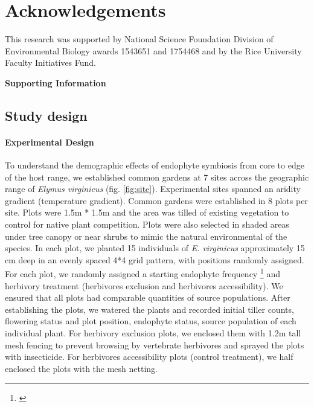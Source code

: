 \documentclass[12pt]{article}\usepackage[]{graphicx}\usepackage[dvipsnames]{xcolor}
\newcommand{\jacob}[2]{{\color{blue}{#1}}\footnote{\textit{\color{blue}{#2}}}}
\begin{document}
\section*{Acknowledgements}
This research was supported by National Science Foundation Division of Environmental Biology awards 1543651 and 1754468 and by the Rice University Faculty Initiatives Fund.



\newpage


\newpage
\clearpage 
\setcounter{equation}{0}
\setcounter{figure}{0}
\setcounter{section}{0}
\setcounter{table}{0}
\renewcommand{\theequation}{S.\arabic{equation}}
\renewcommand{\thetable}{S-\arabic{table}}
\renewcommand{\thefigure}{S-\arabic{figure}}
\renewcommand{\thesection}{S.\arabic{section}}

\centerline{\Large{\textbf{Supporting Information}}}
\subsection*{Study design}
\paragraph {Experimental Design} 
To understand the demographic effects of endophyte symbiosis from core to edge of the host range, we established  common gardens at 7 sites across the geographic range of \emph {Elymus virginicus} (fig. \ref{fig:site}).
Experimental sites spanned an aridity gradient (temperature gradient).
Common gardens were established in 8 plots per site. 
Plots were 1.5m * 1.5m and the area was tilled of existing vegetation to control for native plant competition.
Plots were also selected in shaded areas under tree canopy or near shrubs to mimic the natural environmental of the species.
In each plot,  we planted 15 individuals  of \emph{E. virginicus} approximately 15 cm deep in an evenly spaced 4*4 grid pattern, with positions randomly assigned. 
For each plot, we randomly assigned a starting endophyte frequency  \jacob{(80\%, 60\%, 40\%, 20\%)}{Do we need a schematic of one replicate
of the experimental design?} and herbivory treatment (herbivores exclusion and herbivores accessibility). 
We ensured that all plots had comparable quantities of source populations.
After establishing the plots, we watered the plants and recorded initial tiller counts, flowering status and plot position,  endophyte status, source population of each individual plant. 
For herbivory exclusion plots, we enclosed them with 1.2m tall mesh fencing to prevent browsing by vertebrate herbivores and sprayed the plots with insecticide. 
For herbivores accessibility plots (control treatment), we half enclosed the plots with the mesh netting.
\end{document}

